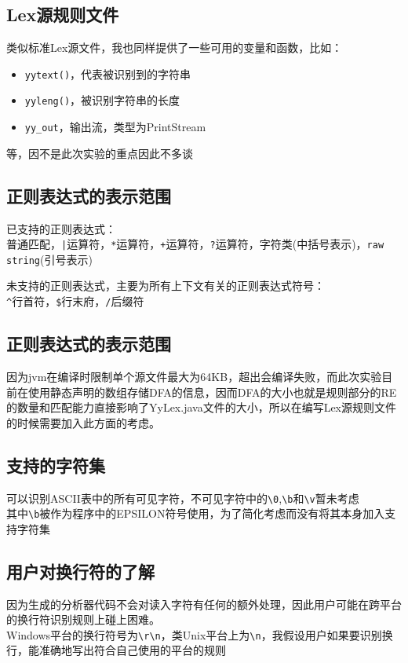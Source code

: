 \documentclass[a4paper]{ctexart} %
\begin{document}
	\subsection{Lex源规则文件}

	类似标准Lex源文件，我也同样提供了一些可用的变量和函数，比如：

	\begin{itemize}
		\item \verb|yytext()|，代表被识别到的字符串
		\item \verb|yyleng()|，被识别字符串的长度
		\item \verb|yy_out|，输出流，类型为PrintStream
	\end{itemize}

	等，因不是此次实验的重点因此不多谈

	\subsection{正则表达式的表示范围}

	已支持的正则表达式：\\
	普通匹配，\verb^|^运算符，\verb|*|运算符，\verb|+|运算符，\verb|?|运算符，字符类(中括号表示)，\verb|raw string|(引号表示)

	未支持的正则表达式，主要为所有上下文有关的正则表达式符号：\\
	\verb|^|行首符，\verb|$|行末府，\verb|/|后缀符

	\subsection{正则表达式的表示范围}
	因为jvm在编译时限制单个源文件最大为64KB，超出会编译失败，而此次实验目前在使用静态声明的数组存储DFA的信息，因而DFA的大小也就是规则部分的RE的数量和匹配能力直接影响了YyLex.java文件的大小，所以在编写Lex源规则文件的时候需要加入此方面的考虑。

	\subsection{支持的字符集}
	可以识别ASCII表中的所有可见字符，不可见字符中的\verb|\0|,\verb|\b|和\verb|\v|暂未考虑\\
	其中\verb|\b|被作为程序中的EPSILON符号使用，为了简化考虑而没有将其本身加入支持字符集

	\subsection{用户对换行符的了解}
	因为生成的分析器代码不会对读入字符有任何的额外处理，因此用户可能在跨平台的换行符识别规则上碰上困难。\\
	Windows平台的换行符号为\verb|\r\n|，类Unix平台上为\verb|\n|，我假设用户如果要识别换行，能准确地写出符合自己使用的平台的规则
\end{document}
